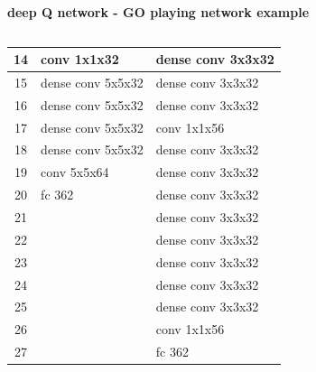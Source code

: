 \documentclass[xcolor=dvipsnames]{beamer}
\begin{document}
\begin{frame}{\bf deep Q network - GO playing network example}
\begin{columns}
\begin{column}{0.8\textwidth}
{\begin{table}[]
\begin{tabular}{|c|l|l|}
    14             & \cellcolor[HTML]{38FFF8}conv 1x1x32       & \cellcolor[HTML]{FD6864}dense conv 3x3x32 \\ \hline
    15             & \cellcolor[HTML]{FD6864}dense conv 5x5x32 & \cellcolor[HTML]{FD6864}dense conv 3x3x32 \\ \hline
    16             & \cellcolor[HTML]{FD6864}dense conv 5x5x32 & \cellcolor[HTML]{FD6864}dense conv 3x3x32 \\ \hline
    17             & \cellcolor[HTML]{FD6864}dense conv 5x5x32 & \cellcolor[HTML]{38FFF8}conv 1x1x56       \\ \hline
    18             & \cellcolor[HTML]{FD6864}dense conv 5x5x32 & \cellcolor[HTML]{FD6864}dense conv 3x3x32 \\ \hline
    19             & \cellcolor[HTML]{38FFF8}conv 5x5x64       & \cellcolor[HTML]{FD6864}dense conv 3x3x32 \\ \hline
    20             & \cellcolor[HTML]{67FD9A}fc 362            & \cellcolor[HTML]{FD6864}dense conv 3x3x32 \\ \hline
    21             &                                           & \cellcolor[HTML]{FD6864}dense conv 3x3x32 \\ \hline
    22             &                                           & \cellcolor[HTML]{FD6864}dense conv 3x3x32 \\ \hline
    23             &                                           & \cellcolor[HTML]{FD6864}dense conv 3x3x32 \\ \hline
    24             &                                           & \cellcolor[HTML]{FD6864}dense conv 3x3x32 \\ \hline
    25             &                                           & \cellcolor[HTML]{FD6864}dense conv 3x3x32 \\ \hline
    26             &                                           & \cellcolor[HTML]{38FFF8}conv 1x1x56       \\ \hline
    27             &                                           & \cellcolor[HTML]{67FD9A}fc 362            \\ \hline
    \end{tabular}
    \end{table}
    }

    \end{column}
\end{columns}


\end{frame}
\end{document}
